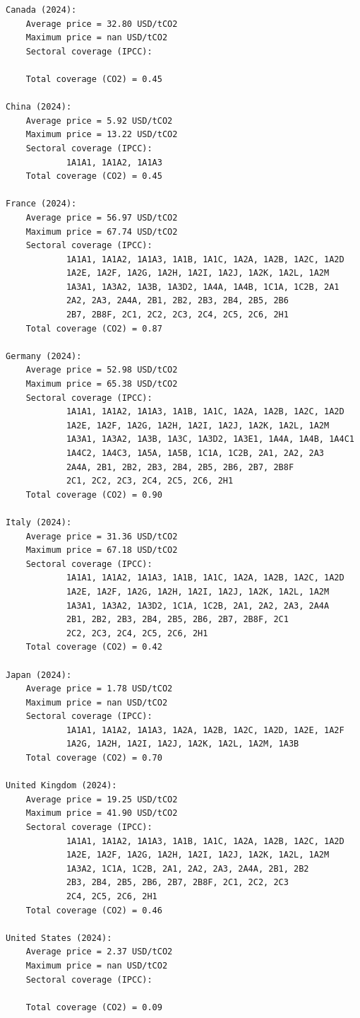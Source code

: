 \documentclass[
  letterpaper,
  DIV=11,
  numbers=noendperiod]{scrartcl}
\begin{document}
\begin{verbatim}
Canada (2024):
    Average price = 32.80 USD/tCO2
    Maximum price = nan USD/tCO2
    Sectoral coverage (IPCC):

    Total coverage (CO2) = 0.45

China (2024):
    Average price = 5.92 USD/tCO2
    Maximum price = 13.22 USD/tCO2
    Sectoral coverage (IPCC):
            1A1A1, 1A1A2, 1A1A3
    Total coverage (CO2) = 0.45

France (2024):
    Average price = 56.97 USD/tCO2
    Maximum price = 67.74 USD/tCO2
    Sectoral coverage (IPCC):
            1A1A1, 1A1A2, 1A1A3, 1A1B, 1A1C, 1A2A, 1A2B, 1A2C, 1A2D
            1A2E, 1A2F, 1A2G, 1A2H, 1A2I, 1A2J, 1A2K, 1A2L, 1A2M
            1A3A1, 1A3A2, 1A3B, 1A3D2, 1A4A, 1A4B, 1C1A, 1C2B, 2A1
            2A2, 2A3, 2A4A, 2B1, 2B2, 2B3, 2B4, 2B5, 2B6
            2B7, 2B8F, 2C1, 2C2, 2C3, 2C4, 2C5, 2C6, 2H1
    Total coverage (CO2) = 0.87

Germany (2024):
    Average price = 52.98 USD/tCO2
    Maximum price = 65.38 USD/tCO2
    Sectoral coverage (IPCC):
            1A1A1, 1A1A2, 1A1A3, 1A1B, 1A1C, 1A2A, 1A2B, 1A2C, 1A2D
            1A2E, 1A2F, 1A2G, 1A2H, 1A2I, 1A2J, 1A2K, 1A2L, 1A2M
            1A3A1, 1A3A2, 1A3B, 1A3C, 1A3D2, 1A3E1, 1A4A, 1A4B, 1A4C1
            1A4C2, 1A4C3, 1A5A, 1A5B, 1C1A, 1C2B, 2A1, 2A2, 2A3
            2A4A, 2B1, 2B2, 2B3, 2B4, 2B5, 2B6, 2B7, 2B8F
            2C1, 2C2, 2C3, 2C4, 2C5, 2C6, 2H1
    Total coverage (CO2) = 0.90

Italy (2024):
    Average price = 31.36 USD/tCO2
    Maximum price = 67.18 USD/tCO2
    Sectoral coverage (IPCC):
            1A1A1, 1A1A2, 1A1A3, 1A1B, 1A1C, 1A2A, 1A2B, 1A2C, 1A2D
            1A2E, 1A2F, 1A2G, 1A2H, 1A2I, 1A2J, 1A2K, 1A2L, 1A2M
            1A3A1, 1A3A2, 1A3D2, 1C1A, 1C2B, 2A1, 2A2, 2A3, 2A4A
            2B1, 2B2, 2B3, 2B4, 2B5, 2B6, 2B7, 2B8F, 2C1
            2C2, 2C3, 2C4, 2C5, 2C6, 2H1
    Total coverage (CO2) = 0.42

Japan (2024):
    Average price = 1.78 USD/tCO2
    Maximum price = nan USD/tCO2
    Sectoral coverage (IPCC):
            1A1A1, 1A1A2, 1A1A3, 1A2A, 1A2B, 1A2C, 1A2D, 1A2E, 1A2F
            1A2G, 1A2H, 1A2I, 1A2J, 1A2K, 1A2L, 1A2M, 1A3B
    Total coverage (CO2) = 0.70

United Kingdom (2024):
    Average price = 19.25 USD/tCO2
    Maximum price = 41.90 USD/tCO2
    Sectoral coverage (IPCC):
            1A1A1, 1A1A2, 1A1A3, 1A1B, 1A1C, 1A2A, 1A2B, 1A2C, 1A2D
            1A2E, 1A2F, 1A2G, 1A2H, 1A2I, 1A2J, 1A2K, 1A2L, 1A2M
            1A3A2, 1C1A, 1C2B, 2A1, 2A2, 2A3, 2A4A, 2B1, 2B2
            2B3, 2B4, 2B5, 2B6, 2B7, 2B8F, 2C1, 2C2, 2C3
            2C4, 2C5, 2C6, 2H1
    Total coverage (CO2) = 0.46

United States (2024):
    Average price = 2.37 USD/tCO2
    Maximum price = nan USD/tCO2
    Sectoral coverage (IPCC):

    Total coverage (CO2) = 0.09
\end{verbatim}
\end{document}
